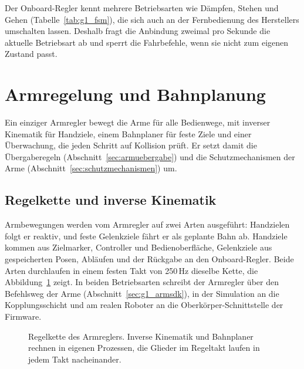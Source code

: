Der Onboard-Regler kennt mehrere Betriebsarten wie Dämpfen, Stehen und Gehen (Tabelle~\ref{tab:g1_fsm}), die sich auch an der Fernbedienung des Herstellers umschalten lassen.
Deshalb fragt die Anbindung zweimal pro Sekunde die aktuelle Betriebsart ab und sperrt die Fahrbefehle, wenn sie nicht zum eigenen Zustand passt.

\section{Armregelung und Bahnplanung}
\label{sec:armregelung}
Ein einziger Armregler bewegt die Arme für alle Bedienwege, mit inverser Kinematik für Handziele, einem Bahnplaner für feste Ziele und einer Überwachung, die jeden Schritt auf Kollision prüft.
Er setzt damit die Übergaberegeln (Abschnitt~\ref{sec:armuebergabe}) und die Schutzmechanismen der Arme (Abschnitt~\ref{sec:schutzmechanismen}) um.

\subsection{Regelkette und inverse Kinematik}
\label{sec:regelkette}
Armbewegungen werden vom Armregler auf zwei Arten ausgeführt: Handzielen folgt er reaktiv, und feste Gelenkziele fährt er als geplante Bahn ab.
Handziele kommen aus Zielmarker, Controller und Bedienoberfläche, Gelenkziele aus gespeicherten Posen, Abläufen und der Rückgabe an den Onboard-Regler.
Beide Arten durchlaufen in einem festen Takt von 250\,Hz dieselbe Kette, die Abbildung~\ref{fig:regelkette} zeigt.
In beiden Betriebsarten schreibt der Armregler über den Befehlsweg der Arme (Abschnitt~\ref{sec:g1_armsdk}), in der Simulation an die Kopplungsschicht und am realen Roboter an die Oberkörper-Schnittstelle der Firmware.

\begin{figure}[htbp]
  \centering
  
  \caption[Regelkette des Armreglers]{Regelkette des Armreglers. Inverse Kinematik und Bahnplaner rechnen in eigenen Prozessen, die Glieder im Regeltakt laufen in jedem Takt nacheinander.}
  \label{fig:regelkette}
\end{figure}

